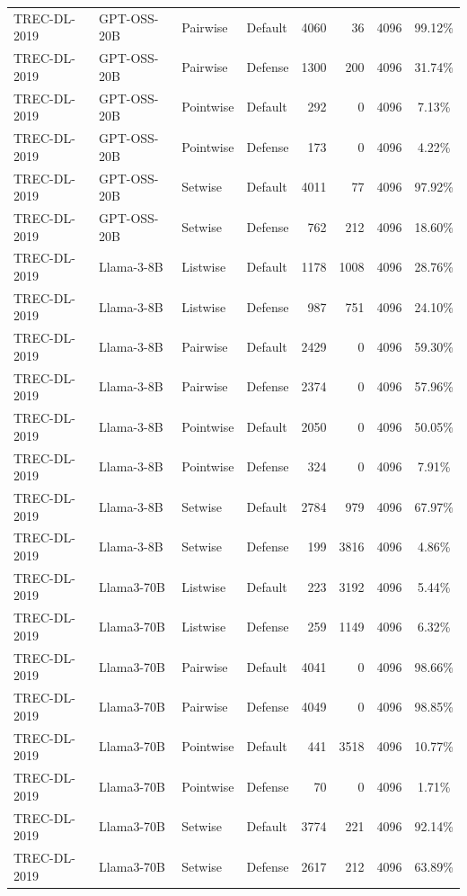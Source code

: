 \begin{table}[t]
\begin{tabular}{ll l l r r r c}
TREC-DL-2019 & GPT-OSS-20B & Pairwise & Default & 4060 & 36 & 4096 & 99.12\% \\
TREC-DL-2019 & GPT-OSS-20B & Pairwise & Defense & 1300 & 200 & 4096 & 31.74\% \\
TREC-DL-2019 & GPT-OSS-20B & Pointwise & Default & 292 & 0 & 4096 & 7.13\% \\
TREC-DL-2019 & GPT-OSS-20B & Pointwise & Defense & 173 & 0 & 4096 & 4.22\% \\
TREC-DL-2019 & GPT-OSS-20B & Setwise & Default & 4011 & 77 & 4096 & 97.92\% \\
TREC-DL-2019 & GPT-OSS-20B & Setwise & Defense & 762 & 212 & 4096 & 18.60\% \\
TREC-DL-2019 & Llama-3-8B & Listwise & Default & 1178 & 1008 & 4096 & 28.76\% \\
TREC-DL-2019 & Llama-3-8B & Listwise & Defense & 987 & 751 & 4096 & 24.10\% \\
TREC-DL-2019 & Llama-3-8B & Pairwise & Default & 2429 & 0 & 4096 & 59.30\% \\
TREC-DL-2019 & Llama-3-8B & Pairwise & Defense & 2374 & 0 & 4096 & 57.96\% \\
TREC-DL-2019 & Llama-3-8B & Pointwise & Default & 2050 & 0 & 4096 & 50.05\% \\
TREC-DL-2019 & Llama-3-8B & Pointwise & Defense & 324 & 0 & 4096 & 7.91\% \\
TREC-DL-2019 & Llama-3-8B & Setwise & Default & 2784 & 979 & 4096 & 67.97\% \\
TREC-DL-2019 & Llama-3-8B & Setwise & Defense & 199 & 3816 & 4096 & 4.86\% \\
TREC-DL-2019 & Llama3-70B & Listwise & Default & 223 & 3192 & 4096 & 5.44\% \\
TREC-DL-2019 & Llama3-70B & Listwise & Defense & 259 & 1149 & 4096 & 6.32\% \\
TREC-DL-2019 & Llama3-70B & Pairwise & Default & 4041 & 0 & 4096 & 98.66\% \\
TREC-DL-2019 & Llama3-70B & Pairwise & Defense & 4049 & 0 & 4096 & 98.85\% \\
TREC-DL-2019 & Llama3-70B & Pointwise & Default & 441 & 3518 & 4096 & 10.77\% \\
TREC-DL-2019 & Llama3-70B & Pointwise & Defense & 70 & 0 & 4096 & 1.71\% \\
TREC-DL-2019 & Llama3-70B & Setwise & Default & 3774 & 221 & 4096 & 92.14\% \\
TREC-DL-2019 & Llama3-70B & Setwise & Defense & 2617 & 212 & 4096 & 63.89\% \\

\end{tabular}
\end{table}
